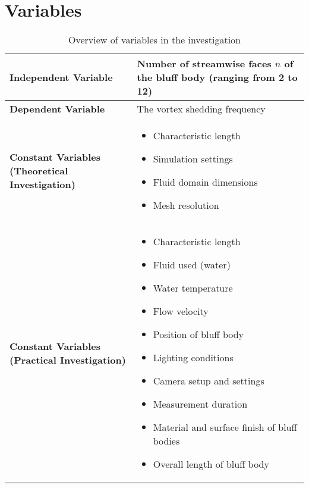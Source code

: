\section{Variables}

\begin{table}[H]
	\centering
	\renewcommand{\arraystretch}{1.3}
	\begin{tabularx}{\textwidth}{|>{\raggedright\arraybackslash}p{5.2cm}|X|}
		\hline
		\textbf{Independent Variable} & Number of streamwise faces $n$ of the bluff body (ranging from 2 to 12) \\
		\hline
		\textbf{Dependent Variable} & The vortex shedding frequency \\
		\hline
		\textbf{Constant Variables (Theoretical Investigation)} &
		\begin{itemize}[leftmargin=1.5em, itemsep=2pt, topsep=0pt, label=--]
			\item Characteristic length
			\item Simulation settings
			\item Fluid domain dimensions
			\item Mesh resolution
		\end{itemize} \\
		\hline
		\textbf{Constant Variables (Practical Investigation)} &
		\begin{itemize}[leftmargin=1.5em, itemsep=2pt, topsep=0pt, label=--]
			\item Characteristic length
			\item Fluid used (water)
			\item Water temperature
			\item Flow velocity
			\item Position of bluff body
			\item Lighting conditions
			\item Camera setup and settings
			\item Measurement duration
			\item Material and surface finish of bluff bodies
			\item Overall length of bluff body
		\end{itemize} \\
		\hline
	\end{tabularx}
	\caption{Overview of variables in the investigation}
	\label{tab:variables}
\end{table}

